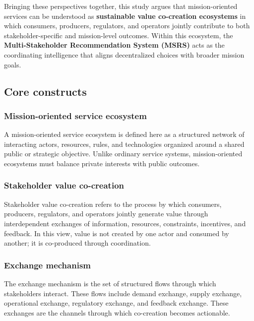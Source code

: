 \documentclass[
  letterpaper,
  DIV=11,
  numbers=noendperiod]{scrartcl}
\begin{document}
Bringing these perspectives together, this study argues that
mission-oriented services can be understood as \textbf{sustainable value
co-creation ecosystems} in which consumers, producers, regulators, and
operators jointly contribute to both stakeholder-specific and
mission-level outcomes. Within this ecosystem, the
\textbf{Multi-Stakeholder Recommendation System (MSRS)} acts as the
coordinating intelligence that aligns decentralized choices with broader
mission goals.

\subsection{Core constructs}\label{core-constructs}

\subsubsection{Mission-oriented service
ecosystem}\label{mission-oriented-service-ecosystem}

A mission-oriented service ecosystem is defined here as a structured
network of interacting actors, resources, rules, and technologies
organized around a shared public or strategic objective. Unlike ordinary
service systems, mission-oriented ecosystems must balance private
interests with public outcomes.

\subsubsection{Stakeholder value
co-creation}\label{stakeholder-value-co-creation}

Stakeholder value co-creation refers to the process by which consumers,
producers, regulators, and operators jointly generate value through
interdependent exchanges of information, resources, constraints,
incentives, and feedback. In this view, value is not created by one
actor and consumed by another; it is co-produced through coordination.

\subsubsection{Exchange mechanism}\label{exchange-mechanism}

The exchange mechanism is the set of structured flows through which
stakeholders interact. These flows include demand exchange, supply
exchange, operational exchange, regulatory exchange, and feedback
exchange. These exchanges are the channels through which co-creation
becomes actionable.
\end{document}
